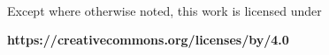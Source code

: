 \begin{frame}[c]
    \begin{columns}[c]
        \begin{column}[c]{.5\textwidth}
        \end{column}
        \begin{column}[c]{.5\textwidth}
        \end{column}
    \end{columns}

    \begin{columns}[c]
        \begin{column}[c]{\textwidth}
            \\
            \centerline{Except where otherwise noted, this work is licensed under}
            \centerline{\textbf{https://creativecommons.org/licenses/by/4.0}}
        \end{column}
    \end{columns}
\end{frame}
